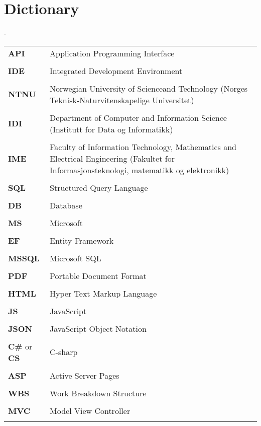 \chapter{Dictionary}.
\begin{longtable}{l p{10cm}}
\textbf{API} & Application Programming Interface\\\\
\textbf{IDE} & Integrated Development Environment\\\\
\textbf{NTNU} & Norwegian University of Scienceand Technology (Norges Teknisk-Naturvitenskapelige Universitet)\\\\
\textbf{IDI} & Department of Computer and Information Science (Institutt for Data og Informatikk)\\\\
\textbf{IME} & Faculty of Information Technology, Mathematics and Electrical Engineering (Fakultet for Informasjonsteknologi, matematikk og elektronikk)\\\\
\textbf{SQL} & Structured Query Language\\\\
\textbf{DB} & Database\\\\
\textbf{MS} & Microsoft\\\\
\textbf{EF} & Entity Framework\\\\
\textbf{MSSQL} & Microsoft SQL\\\\
\textbf{PDF} & Portable Document Format\\\\
\textbf{HTML} & Hyper Text Markup Language\\\\
\textbf{JS} & JavaScript\\\\
\textbf{JSON }& JavaScript Object Notation\\\\
\textbf{C\#} or \textbf{CS} & C-sharp\\\\
\textbf{ASP} & Active Server Pages\\\\
\textbf{WBS} & Work Breakdown Structure\\\\
\textbf{MVC} & Model View Controller\\\\

\end{longtable}
